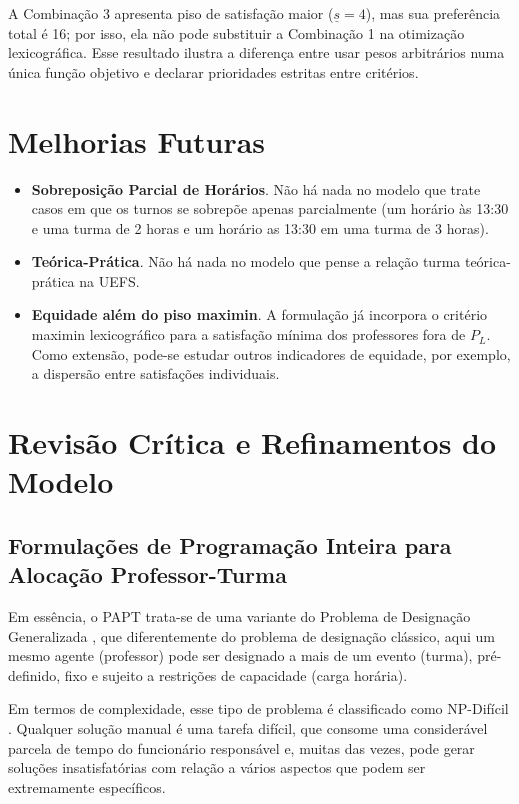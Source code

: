 \documentclass[11pt,a4paper]{article}
\begin{document}
A Combinação 3 apresenta piso de satisfação maior ($\underline{s}=4$), mas sua preferência total é 16; por isso, ela não pode substituir a Combinação 1 na otimização lexicográfica. Esse resultado ilustra a diferença entre usar pesos arbitrários numa única função objetivo e declarar prioridades estritas entre critérios.

\section{Melhorias Futuras}
\begin{itemize}
    \item \textbf{Sobreposição Parcial de Horários}. Não há nada no modelo que trate casos em que os turnos se sobrepõe apenas parcialmente (um horário às 13:30 e uma turma de 2 horas e um horário as 13:30 em uma turma de 3 horas).
    \item \textbf{Teórica-Prática}. Não há nada no modelo que pense a relação turma teórica-prática na UEFS.
    \item \textbf{Equidade além do piso maximin}. A formulação já incorpora o critério maximin lexicográfico para a satisfação mínima dos professores fora de $P_L$. Como extensão, pode-se estudar outros indicadores de equidade, por exemplo, a dispersão entre satisfações individuais.
\end{itemize}

\section{Revisão Crítica e Refinamentos do Modelo}\label{sec:refinamentos}


\subsection{Formulações de Programação Inteira para Alocação Professor-Turma}


Em essência, o PAPT trata-se de uma variante do Problema de Designação Generalizada \cite{arenales2007pesquisa}, que diferentemente do problema de designação clássico, aqui um mesmo agente (professor) pode ser designado a mais de um evento (turma), pré-definido, fixo e sujeito a restrições de capacidade (carga horária). 

Em termos de complexidade, esse tipo de problema é classificado como NP-Difícil \cite{martellototh1990}. Qualquer solução manual é uma tarefa difícil, que consome uma considerável parcela de tempo do funcionário responsável e, muitas das vezes, pode gerar soluções insatisfatórias com relação a vários aspectos que podem ser extremamente específicos.
\end{document}
